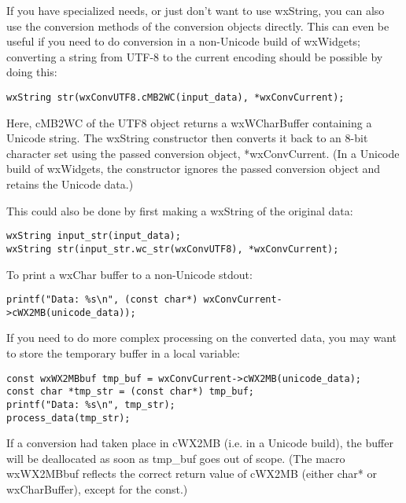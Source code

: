 If you have specialized needs, or just don't want to use wxString, you
can also use the conversion methods of the conversion objects directly.
This can even be useful if you need to do conversion in a non-Unicode
build of wxWidgets; converting a string from UTF-8 to the current
encoding should be possible by doing this:

\begin{verbatim}
wxString str(wxConvUTF8.cMB2WC(input_data), *wxConvCurrent);
\end{verbatim}

Here, cMB2WC of the UTF8 object returns a wxWCharBuffer containing a Unicode
string. The wxString constructor then converts it back to an 8-bit character
set using the passed conversion object, *wxConvCurrent. (In a Unicode build
of wxWidgets, the constructor ignores the passed conversion object and
retains the Unicode data.)

This could also be done by first making a wxString of the original data:

\begin{verbatim}
wxString input_str(input_data);
wxString str(input_str.wc_str(wxConvUTF8), *wxConvCurrent);
\end{verbatim}

To print a wxChar buffer to a non-Unicode stdout:

\begin{verbatim}
printf("Data: %s\n", (const char*) wxConvCurrent->cWX2MB(unicode_data));
\end{verbatim}

If you need to do more complex processing on the converted data, you
may want to store the temporary buffer in a local variable:

\begin{verbatim}
const wxWX2MBbuf tmp_buf = wxConvCurrent->cWX2MB(unicode_data);
const char *tmp_str = (const char*) tmp_buf;
printf("Data: %s\n", tmp_str);
process_data(tmp_str);
\end{verbatim}

If a conversion had taken place in cWX2MB (i.e. in a Unicode build),
the buffer will be deallocated as soon as tmp\_buf goes out of scope.
(The macro wxWX2MBbuf reflects the correct return value of cWX2MB
(either char* or wxCharBuffer), except for the const.)

